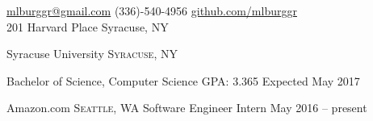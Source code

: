 \documentclass[10pt,a4paper]{article}
\begin{document}
\sloppy  %



\nobreakvspace{0.3em}  %

\noindent\href{mailto:mlburggr@gmail.com}{mlburggr\mbox{}@\mbox{}gmail.com}\sbull
(336)-540-4956\sbull
\href{https://github.com/mlburggr}{github.com/mlburggr}
\\
201 Harvard Place\sbull
Syracuse, NY

\spacedhrule{0.9em}{-0.4em}  %


\headedsection
  {Syracuse University}
  {\textsc{Syracuse, NY}} {%
  \headedsubsection
    {Bachelor of Science, Computer Science \sbull GPA: 3.365}
    {Expected May 2017}

}


\spacedhrule{0em}{0em}


\headedsection  %
  {Amazon.com}
  {\textsc{Seattle, WA}} {%
  \headedsubsection
    {Software Engineer Intern}
    {May 2016 -- present}
    {}
}
\end{document}
